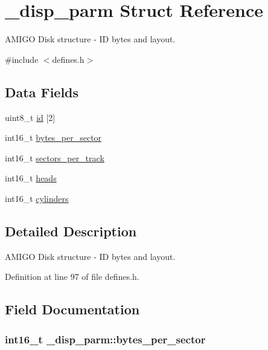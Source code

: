 \hypertarget{struct__disp__parm}{}\section{\+\_\+disp\+\_\+parm Struct Reference}
\label{struct__disp__parm}


A\+M\+I\+GO Disk structure -\/ ID bytes and layout.  




{\ttfamily \#include $<$defines.\+h$>$}

\subsection*{Data Fields}
\begin{DoxyCompactItemize}
\item 
uint8\+\_\+t \hyperlink{struct__disp__parm_adc781d8c48b2aa39c092fcb206f15e8c}{id} \mbox{[}2\mbox{]}
\item 
int16\+\_\+t \hyperlink{struct__disp__parm_ad575790e79a6bdf19bffcb8dda1df180}{bytes\+\_\+per\+\_\+sector}
\item 
int16\+\_\+t \hyperlink{struct__disp__parm_a870887d0582245d0c35f34724180463c}{sectors\+\_\+per\+\_\+track}
\item 
int16\+\_\+t \hyperlink{struct__disp__parm_a013e3f25cec51e3edfae124ed5d22cb9}{heads}
\item 
int16\+\_\+t \hyperlink{struct__disp__parm_ac4687d407f95a65e86313cde433832a4}{cylinders}
\end{DoxyCompactItemize}


\subsection{Detailed Description}
A\+M\+I\+GO Disk structure -\/ ID bytes and layout. 

Definition at line 97 of file defines.\+h.



\subsection{Field Documentation}
\subsubsection[{\texorpdfstring{bytes\+\_\+per\+\_\+sector}{bytes_per_sector}}]{\setlength{\rightskip}{0pt plus 5cm}int16\+\_\+t \+\_\+disp\+\_\+parm\+::bytes\+\_\+per\+\_\+sector}\hypertarget{struct__disp__parm_ad575790e79a6bdf19bffcb8dda1df180}{}\label{struct__disp__parm_ad575790e79a6bdf19bffcb8dda1df180}



